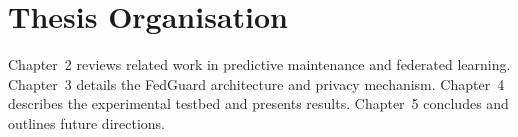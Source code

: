 \section{Thesis Organisation}
Chapter~2 reviews related work in predictive maintenance and federated learning.
Chapter~3 details the FedGuard architecture and privacy mechanism. Chapter~4 describes
the experimental testbed and presents results. Chapter~5 concludes and outlines future
directions.
